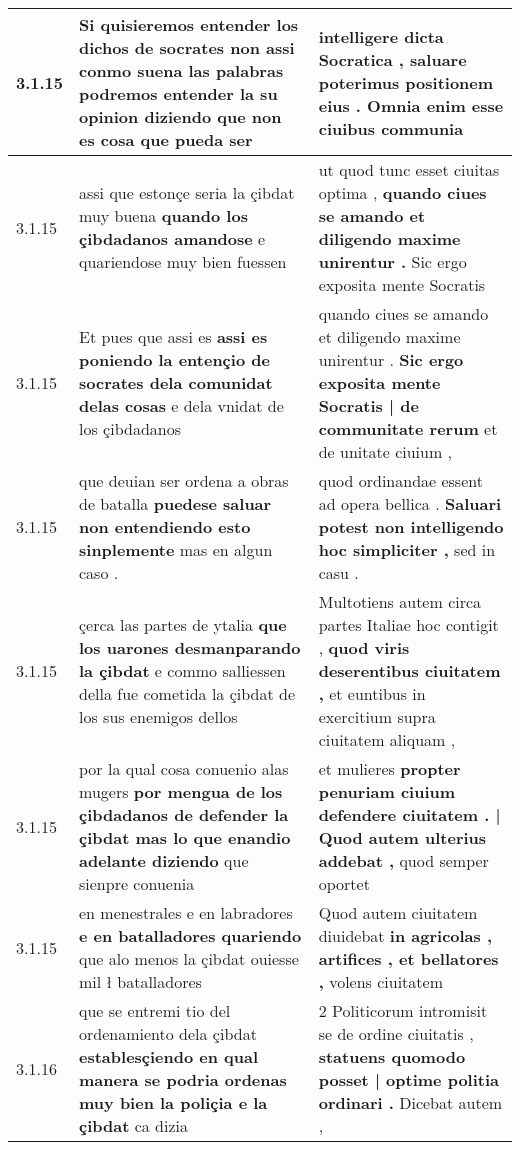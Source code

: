 \begin{tabular}{|p{1cm}|p{6.5cm}|p{6.5cm}|}
3.1.15 & Si quisieremos entender los dichos de socrates \textbf{ non assi conmo suena las palabras podremos entender la su opinion diziendo } que non es cosa que pueda ser & intelligere dicta Socratica , \textbf{ saluare poterimus positionem eius . } Omnia enim esse ciuibus communia \\\hline
3.1.15 & assi que estonçe seria la çibdat muy buena \textbf{ quando los çibdadanos amandose } e quariendose muy bien fuessen & ut quod tunc esset ciuitas optima , \textbf{ quando ciues se amando et diligendo maxime unirentur . } Sic ergo exposita mente Socratis \\\hline
3.1.15 & Et pues que assi es \textbf{ assi es poniendo la entençio de socrates dela comunidat delas cosas } e dela vnidat de los çibdadanos & quando ciues se amando et diligendo maxime unirentur . \textbf{ Sic ergo exposita mente Socratis | de communitate rerum } et de unitate ciuium , \\\hline
3.1.15 & que deuian ser ordena a obras de batalla \textbf{ puedese saluar non entendiendo esto sinplemente } mas en algun caso . & quod ordinandae essent ad opera bellica . \textbf{ Saluari potest non intelligendo hoc simpliciter , } sed in casu . \\\hline
3.1.15 & çerca las partes de ytalia \textbf{ que los uarones desmanparando la çibdat } e commo salliessen della fue cometida la çibdat de los sus enemigos dellos & Multotiens autem circa partes Italiae hoc contigit , \textbf{ quod viris deserentibus ciuitatem , } et euntibus in exercitium supra ciuitatem aliquam , \\\hline
3.1.15 & por la qual cosa conuenio alas mugers \textbf{ por mengua de los çibdadanos de defender la çibdat mas lo que enandio adelante diziendo } que sienpre conuenia & et mulieres \textbf{ propter penuriam ciuium defendere ciuitatem . | Quod autem ulterius addebat , } quod semper oportet \\\hline
3.1.15 & en menestrales e en labradores \textbf{ e en batalladores quariendo } que alo menos la çibdat ouiesse mil ł batalladores & Quod autem ciuitatem diuidebat \textbf{ in agricolas , artifices , et bellatores , } volens ciuitatem \\\hline
3.1.16 & que se entremi tio del ordenamiento dela çibdat \textbf{ establesçiendo en qual manera se podria ordenas muy bien la poliçia e la çibdat } ca dizia & 2 Politicorum intromisit se de ordine ciuitatis , \textbf{ statuens quomodo posset | optime politia ordinari . } Dicebat autem , \\\hline

\end{tabular}

